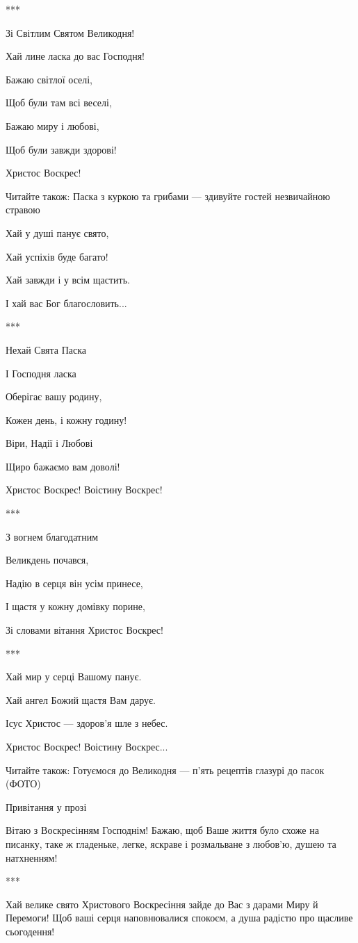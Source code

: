 ***

Зі Світлим Святом Великодня!

Хай лине ласка до вас Господня!

Бажаю світлої оселі,

Щоб були там всі веселі,

Бажаю миру і любові,

Щоб були завжди здорові!

Христос Воскрес!

Читайте також: Паска з куркою та грибами — здивуйте гостей незвичайною стравою

Хай у душі панує свято,

Хай успіхів буде багато!

Хай завжди і у всім щастить.

І хай вас Бог благословить...

***

Нехай Свята Паска

І Господня ласка

Оберігає вашу родину,

Кожен день, і кожну годину!

Віри, Надії і Любові

Щиро бажаємо вам доволі!

Христос Воскрес! Воістину Воскрес!

***

З вогнем благодатним

Великдень почався,

Надію в серця він усім принесе,

І щастя у кожну домівку порине,

Зі словами вітання Христос Воскрес!

***

Хай мир у серці Вашому панує.

Хай ангел Божий щастя Вам дарує.

Ісус Христос — здоров'я шле з небес.

Христос Воскрес! Воістину Воскрес...

Читайте також: Готуємося до Великодня — п'ять рецептів глазурі до пасок (ФОТО)

Привітання у прозі

Вітаю з Воскресінням Господнім! Бажаю, щоб Ваше життя було схоже на писанку, таке ж гладеньке, легке, яскраве і розмальване з любов'ю, душею та натхненням!

***

Хай велике свято Христового Воскресіння зайде до Вас з дарами Миру й Перемоги! Щоб ваші серця наповнювалися спокоєм, а душа радістю про щасливе сьогодення!

